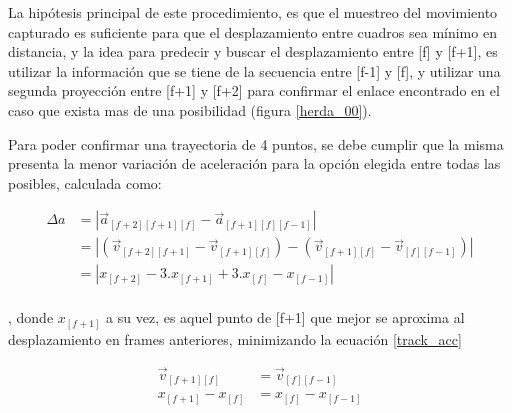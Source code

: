 La hipótesis principal de este procedimiento, es que el muestreo del movimiento capturado  es suficiente para que el desplazamiento entre cuadros sea mínimo en distancia, y la idea para predecir y buscar el desplazamiento entre [f] y [f+1], es utilizar la información que se tiene de la secuencia entre [f-1] y [f], y utilizar una segunda proyección entre [f+1] y [f+2] para confirmar el enlace encontrado en el caso que exista mas de una posibilidad (figura \ref{herda_00}).

Para poder confirmar una trayectoria de 4 puntos, se debe cumplir que la misma presenta la menor variación de aceleración para la opción elegida entre todas las posibles, calculada como:

\begin{equation}
\begin{split}
\Delta{a}&= \left| \overrightarrow{a}_{[f+2][f+1][f]}-\overrightarrow{a}_{[f+1][f][f-1]} \right| \\
&= \left| \left(\overrightarrow{v}_{[f+2][f+1]}-\overrightarrow{v}_{[f+1][f]}\right)-\left(\overrightarrow{v}_{[f+1][f]}-\overrightarrow{v}_{[f][f-1]}\right) \right| \\
&= \left| x_{[f+2]} - 3.x_{[f+1]} + 3.x_{[f]} - x_{[f-1]} \right|\\
\end{split}
\label{track_var_acc}
\end{equation}

, donde $x_{[f+1]}$ a su vez, es aquel punto de [f+1] que mejor se aproxima al desplazamiento en frames anteriores, minimizando la ecuación \ref{track_acc} 

\begin{equation}
\begin{split}
\overrightarrow{v}_{[f+1][f]}& = \overrightarrow{v}_{[f][f-1]} \\
x_{[f+1]}-x_{[f]}& = x_{[f]}-x_{[f-1]} \\
\end{split}
\label{track_acc}
\end{equation}

